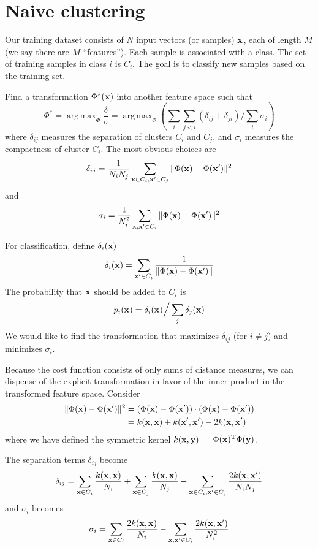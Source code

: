 \documentclass{article}
\newcommand{\bx}{{\bf x}}
\newcommand{\by}{{\bf y}}
\newcommand{\bxp}{\bx^{\prime}}
\DeclareMathOperator*{\argmax}{arg\,max}
\begin{document}
\section*{Naive clustering}

Our training dataset consists of $N$ input vectors (or samples) $\bx$,
each of length $M$ (we say there are $M$ ``features''). Each sample is
associated with a class. The set of training samples in class $i$ is $C_i$.
The goal is to classify new samples based on the training set.

Find a transformation $\Phi^*(\bx)$ into another feature space
such that
\[
\Phi^* = \argmax_{\Phi} \frac{\delta}{\sigma} = \argmax_{\Phi} ( \sum_i \sum_{j < i}
(\delta_{ij} + \delta_{ji}) \Big / \sum_i \sigma_i )
\]
where $\delta_{ij}$ measures the separation of clusters
$C_i$ and $C_j$, and $\sigma_i$ measures the compactness of cluster $C_i$.
The most obvious choices are
\[
\delta_{ij} =
  \frac{1}{N_i N_j}
  \sum_{\bx \in C_i, \bxp \in C_j} \| \Phi(\bx) - \Phi(\bxp) \|^2
\]
and
\[
\sigma_i =
  \frac{1}{N_i^2} \sum_{\bx, \bxp \in C_i} \| \Phi(\bx) - \Phi(\bxp) \|^2
\]

For classification, define $\delta_i(\bx)$
\[
\delta_i(\bx) = \sum_{\bxp \in C_i} \frac{1}{\| \Phi(\bx) - \Phi(\bxp)
\|}
\]
The probability that $\bx$ should be added to $C_i$ is
\[
p_i(\bx) = \delta_i(\bx) \Big / \sum_j \delta_j(\bx)
\]
We would like to find the transformation that maximizes $\delta_{ij}$
(for $i \neq j$) and minimizes $\sigma_i$.


Because the cost function consists of only sums of distance measures,
we can dispense of the explicit transformation in favor of the inner
product in the transformed feature space. Consider
\begin{align*}
\| \Phi(\bx) - \Phi(\bxp) \|^2 &= 
(\Phi(\bx) - \Phi(\bxp)) \cdot (\Phi(\bx) - \Phi(\bxp)) \\
&= k(\bx, \bx) + k(\bxp, \bxp) - 2 k(\bx, \bxp)
\end{align*}
where we have defined the symmetric kernel $k(\bx, \by)$ = $\Phi(\bx)^{\rm
T}\Phi(\by)$.

The separation terms $\delta_{ij}$ become
\[
\delta_{ij} = 
  \sum_{\bx \in C_i} \frac{k(\bx, \bx)}{N_i} +
  \sum_{\bx \in C_j} \frac{k(\bx, \bx)}{N_j} -
  \sum_{\bx \in C_i, \bxp \in C_j} \frac{2 k(\bx, \bxp)}{N_i N_j}
\]
and $\sigma_i$ becomes
\[
\sigma_i =
   \sum_{\bx \in C_i} \frac{2 k(\bx, \bx)}{N_i} -
   \sum_{\bx, \bxp \in C_i} \frac{2 k(\bx, \bxp)}{N_i^2}
\]
\end{document}
